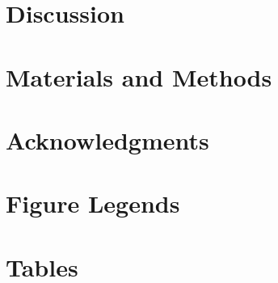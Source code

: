 \documentclass[10pt]{article}
\begin{document}
\section*{Discussion}










\section*{Materials and Methods}











\section*{Acknowledgments}











\section*{Figure Legends}


\section*{Tables}
\end{document}

